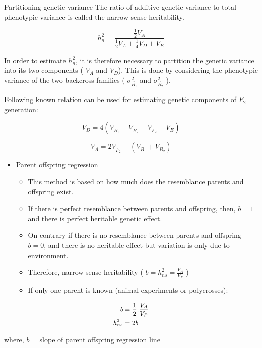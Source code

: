 \documentclass[11pt,ignorenonframetext,aspectratio=169]{beamer}
\providecommand{\tightlist}{%
  \setlength{\itemsep}{0pt}\setlength{\parskip}{0pt}}
\begin{document}
\begin{frame}{Partitioning genetic variance}
\protect\hypertarget{partitioning-genetic-variance}{}
The ratio of additive genetic variance to total phenotypic variance is
called the narrow-sense heritability.

\[
h_n^2 = \frac{\frac{1}{2}V_A}{\frac{1}{2}V_A + \frac{1}{4}V_D + V_E}
\]

In order to estimate \(h_n^2\), it is therefore necessary to partition
the genetic variance into its two components ( \(V_A\) and \(V_D\)).
This is done by considering the phenotypic variance of the two backcross
families ( \(\sigma_{\bar{B_1}}^2\) and \(\sigma_{\bar{B_2}}^2\) ).

Following known relation can be used for estimating genetic components
of \(F_2\) generation:

\[V_D = 4\left(V_{\bar{B_1}} + V_{\bar{B_2}} - V_{\bar{F_2}} - V_E \right)\]

\[V_A = 2V_{\bar{F_2}} - (V_{B_1} + V_{B_2})\]
\end{frame}

\begin{frame}{}
\protect\hypertarget{section-10}{}
\begin{itemize}
\tightlist
\item
  Parent offspring regression

  \begin{itemize}
  \tightlist
  \item
    This method is based on how much does the resemblance parents and
    offspring exist.
  \item
    If there is perfect resemblance between parents and offspring, then,
    \(b = 1\) and there is perfect heritable genetic effect.
  \item
    On contrary if there is no resemblance between parents and offspring
    \(b = 0\), and there is no heritable effect but variation is only
    due to environment.
  \item
    Therefore, narrow sense heritability (
    \(b = h_{ns}^2 = \frac{V_{A}}{V_{P}}\) )
  \item
    If only one parent is known (animal experiments or polycrosses):
  \end{itemize}
\end{itemize}

\[
\small
\begin{aligned}
b &= \frac{1}{2}.\frac{V_{A}}{V_{P}}\\
h_{ns}^2 &= 2b
\end{aligned}
\]

where, \(b\) = slope of parent offspring regression line
\end{frame}
\end{document}
